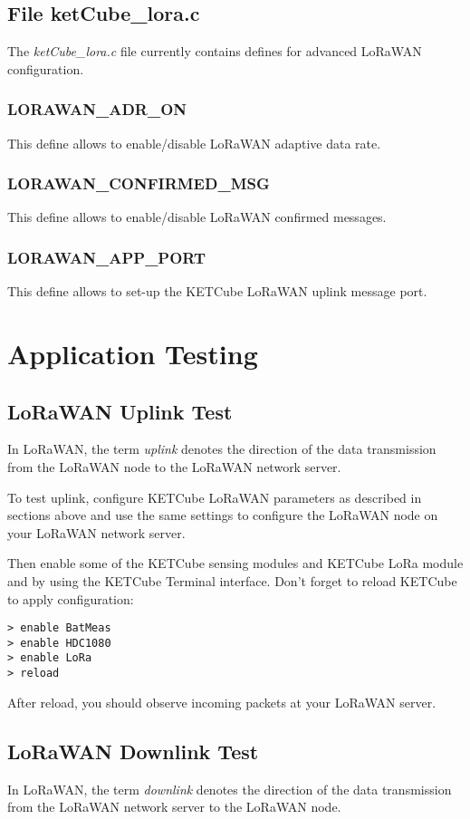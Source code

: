 \documentclass[twoside,a4paper]{refart}
\begin{document}
\subsection{File ketCube\_lora.c}
The {\it ketCube\_lora.c} file currently contains defines for advanced LoRaWAN configuration.

\subsubsection{LORAWAN\_ADR\_ON}
This define allows to enable/disable LoRaWAN adaptive data rate.

\subsubsection{LORAWAN\_CONFIRMED\_MSG}
This define allows to enable/disable LoRaWAN confirmed messages.

\subsubsection{LORAWAN\_APP\_PORT}
This define allows to set-up the KETCube LoRaWAN uplink message port.

\clearpage
\section{Application Testing}
\subsection{LoRaWAN Uplink Test}
In LoRaWAN, the term {\it uplink} denotes the direction of the data transmission from the LoRaWAN node to the LoRaWAN network server.

To test uplink, configure KETCube LoRaWAN parameters as described in sections above and use the same settings to configure the LoRaWAN node on your LoRaWAN network server.

Then enable some of the KETCube sensing modules and KETCube LoRa module and by using the KETCube Terminal interface. Don't forget to reload KETCube to apply configuration:

\begin{Verbatim}[frame=single, fontsize=\small]
> enable BatMeas
> enable HDC1080
> enable LoRa
> reload
\end{Verbatim}

After reload, you should observe incoming packets at your LoRaWAN server.

\subsection{LoRaWAN Downlink Test}
In LoRaWAN, the term {\it downlink} denotes the direction of the data transmission from the LoRaWAN network server to the LoRaWAN node.
\end{document}
